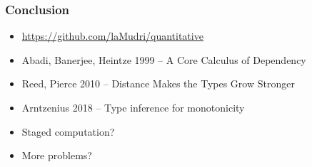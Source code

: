 \documentclass[fleqn]{beamer}
\begin{document}
  \begin{frame}
    \frametitle{Conclusion}
    \begin{itemize}
    \item \url{https://github.com/laMudri/quantitative} \pause
    \item Abadi, Banerjee, Heintze 1999 -- A Core Calculus of Dependency
    \item Reed, Pierce 2010 -- Distance Makes the Types Grow Stronger
    \item Arntzenius 2018 -- Type inference for monotonicity \pause
    \item Staged computation?
    \item More problems?
    \end{itemize}
  \end{frame}
\end{document}
